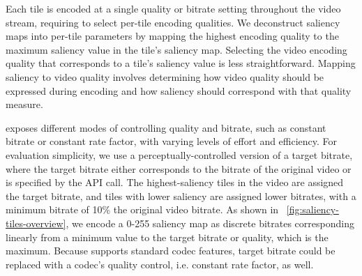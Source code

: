 Each \hevc tile is encoded at a single quality or bitrate setting throughout the video stream, requiring \nameCompress to select per-tile encoding qualities.
We deconstruct saliency maps into per-tile parameters by mapping the highest encoding quality to the maximum saliency value in the tile's saliency map.
Selecting the video encoding quality that corresponds to a tile's saliency value is less straightforward.
Mapping saliency to video quality involves determining how video quality should be expressed during encoding and how saliency should correspond with that quality measure.

\hevc exposes different modes of controlling quality and bitrate, such as constant bitrate or constant rate factor, with varying levels of effort and efficiency.
For evaluation simplicity, we use a perceptually-controlled version of a target bitrate, where the target bitrate either corresponds to the bitrate of the original video or is specified by the API call.
The highest-saliency tiles in the video are assigned the target bitrate, and tiles with lower saliency are assigned lower bitrates, with a minimum bitrate of 10\% the original video bitrate.
As shown in ~\ref{fig:saliency-tiles-overview}, we encode a 0-255 saliency map as discrete bitrates corresponding linearly from a minimum value to the target bitrate or quality, which is the maximum.
Because \name supports standard codec features, target bitrate could be replaced with a codec's quality control, i.e. constant rate factor, as well.

